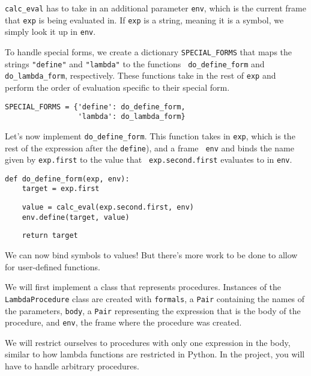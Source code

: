 {\tt calc\_eval} has to take in an additional parameter {\tt env}, which is the
current frame that {\tt exp} is being evaluated in. If {\tt exp} is a string,
meaning it is a symbol, we simply look it up in {\tt env}.

To handle special forms, we create a dictionary {\tt SPECIAL\_FORMS} that maps
the strings {\tt "define"} and {\tt "lambda"} to the functions {\tt
do\_define\_form} and {\tt do\_lambda\_form}, respectively. These functions take
in the rest of {\tt exp} and perform the order of evaluation specific to their
special form.\\

\begin{lstlisting}
SPECIAL_FORMS = {'define': do_define_form,
                 'lambda': do_lambda_form}
\end{lstlisting}

\question
Let's now implement {\tt do\_define\_form}. This function takes in {\tt exp},
which is the rest of the expression after the {\tt define}), and a frame {\tt
env} and binds the name given by {\tt exp.first} to the value that {\tt
exp.second.first} evaluates to in {\tt env}.\\

\begin{lstlisting}
def do_define_form(exp, env):
    target = exp.first
\end{lstlisting}
\begin{solution}[1in]
\begin{lstlisting}
    value = calc_eval(exp.second.first, env)
    env.define(target, value)
\end{lstlisting}
\end{solution}
\begin{lstlisting}
    return target
\end{lstlisting}

\question
We can now bind symbols to values! But there's more work to be done to allow for
user-defined functions.

We will first implement a class that represents procedures. Instances of the
{\tt LambdaProcedure} class are created with {\tt formals}, a {\tt Pair}
containing the names of the parameters, {\tt body}, a {\tt Pair} representing
the expression that is the body of the procedure, and {\tt env}, the frame where
the procedure was created.

We will restrict ourselves to procedures with only one expression in the body,
similar to how lambda functions are restricted in Python. In the project, you
will have to handle arbitrary procedures.

